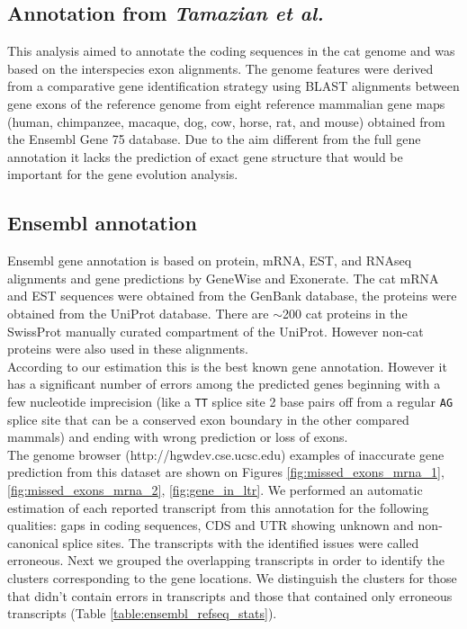\documentclass{article}
\begin{document}
\subsection{Annotation from \textit{Tamazian et al.}}
This analysis aimed to annotate the coding sequences in the cat genome and was based on the interspecies exon alignments.
The genome features were derived from a comparative gene identification strategy using BLAST alignments between gene exons of the reference genome from eight reference mammalian gene maps (human, chimpanzee, macaque, dog, cow, horse, rat, and mouse) obtained from the Ensembl Gene 75 database.
Due to the aim different from the full gene annotation it lacks the prediction of exact gene structure that would be important for the gene evolution analysis. 

\subsection{Ensembl annotation}
Ensembl gene annotation is based on protein, mRNA, EST, and RNAseq alignments and gene predictions by GeneWise and Exonerate. The cat mRNA and EST sequences were obtained from the GenBank database, the proteins were obtained from the UniProt database. There are $\sim$200 cat proteins in the SwissProt manually curated compartment of the UniProt. However non-cat proteins  were also used in these alignments.\\
According to our estimation this is the best known gene annotation. 
However it has a significant number of errors among the predicted genes beginning with a few nucleotide imprecision (like a \texttt{TT} splice site 2 base pairs off from a regular \texttt{AG} splice site that can be a conserved exon boundary in the other compared mammals) and ending with wrong prediction or loss of exons.\\
The genome browser (http://hgwdev.cse.ucsc.edu) examples of inaccurate gene prediction from this dataset are shown on Figures \ref{fig:missed_exons_mrna_1}, \ref{fig:missed_exons_mrna_2}, \ref{fig:gene_in_ltr}.
We performed an automatic estimation of each reported transcript from this annotation for the following qualities: gaps in coding sequences, CDS and UTR showing unknown and non-canonical splice sites. The transcripts with the identified issues were called erroneous. Next we grouped the overlapping transcripts in order to identify the clusters corresponding to the gene locations. We distinguish the clusters for those that didn’t contain errors in transcripts and those that contained only erroneous transcripts (Table \ref{table:ensembl_refseq_stats}). \\
\end{document}
